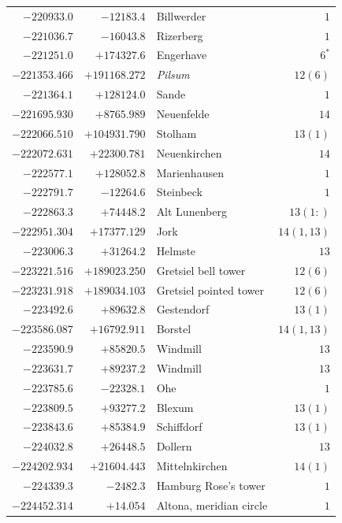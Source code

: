 \begin{center}
\begin{tabular}{r|r|p{170pt}|r}
\(-220933.0\)&\(-12183.4\)&Billwerder&\(1\)\\
\(-221036.7\)&\(-16043.8\)&Rizerberg&\(1\)\\
\(-221251.0\)&\(+174327.6\)&Engerhave&\(6^{*}\)\\
\(-221353.466\)&\(+191168.272\)&\textit{Pilsum}&\(12 (6)\)\\
\(-221364.1\)&\(+128124.0\)&Sande&\(1\)\\
\(-221695.930\)&\(+8765.989\)&Neuenfelde&\(14\)\\
\(-222066.510\)&\(+104931.790\)&Stolham&\(13 (1)\)\\
\(-222072.631\)&\(+22300.781\)&Neuenkirchen&\(14\)\\
\(-222577.1\)&\(+128052.8\)&Marienhausen&\(1\)\\
\(-222791.7\)&\(-12264.6\)&Steinbeck&\(1\)\\
\(-222863.3\)&\(+74448.2\)&Alt Lunenberg&\(13 (1:)\)\\
\(-222951.304\)&\(+17377.129\)&Jork&\(14(1,13)\)\\
\(-223006.3\)&\(+31264.2\)&Helmste&\(13\)\\
\(-223221.516\)&\(+189023.250\)&Gretsiel bell tower&\(12 (6)\)\\
\(-223231.918\)&\(+189034.103\)&Gretsiel pointed tower&\(12 (6)\)\\
\(-223492.6\)&\(+89632.8\)&Gestendorf&\(13 (1)\)\\
\(-223586.087\)&\(+16792.911\)&Borstel&\(14(1,13)\)\\
\(-223590.9\)&\(+85820.5\)&Windmill&\(13\)\\
\(-223631.7\)&\(+89237.2\)&Windmill&\(13\)\\
\(-223785.6\)&\(-22328.1\)&Ohe&\(1\)\\
\(-223809.5\)&\(+93277.2\)&Blexum&\(13 (1)\)\\
\(-223843.6\)&\(+85384.9\)&Schiffdorf&\(13 (1)\)\\
\(-224032.8\)&\(+26448.5\)&Dollern&\(13\)\\
\(-224202.934\)&\(+21604.443\)&Mittelnkirchen&\(14 (1)\)\\
\(-224339.3\)&\(-2482.3\)&Hamburg Rose’s tower&\(1\)\\
\(-224452.314\)&\(+14.054\)&Altona, meridian circle&\(1\)\\
\hline\end{tabular}\endgroup\end{center}
